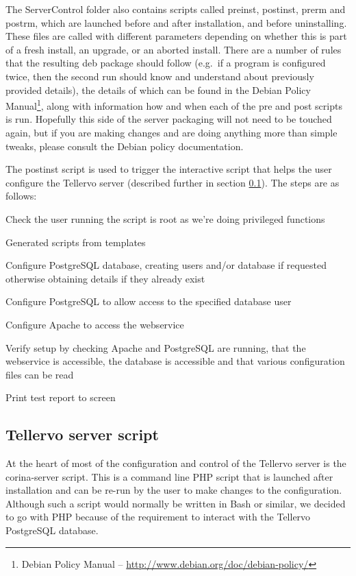 The ServerControl folder also contains scripts called preinst, postinst, prerm and postrm, which are launched before and after installation, and before uninstalling.  These files are called with different parameters depending on whether this is part of a fresh install, an upgrade, or an aborted install.  There are a number of rules that the resulting deb package should follow (e.g.\ if a program is configured twice, then the second run should know and understand about previously provided details), the details of which can be found in the Debian Policy Manual\footnote{Debian Policy Manual -- \url{http://www.debian.org/doc/debian-policy/}}, along with information how and when each of the pre and post scripts is run.  Hopefully this side of the server packaging will not need to be touched again, but if you are making changes and are doing anything more than simple tweaks, please consult the Debian policy documentation.

The postinst script is used to trigger the interactive script that helps the user configure the Tellervo server (described further in section \ref{txt:corina-server-script}).  The steps are as follows:  

\begin{itemize*}
 \item Check the user running the script is root as we're doing privileged functions
 \item Generated scripts from templates
 \item Configure PostgreSQL database, creating users and/or database if requested otherwise obtaining details if they already exist
 \item Configure PostgreSQL to allow access to the specified database user
 \item Configure Apache to access the webservice
 \item Verify setup by checking Apache and PostgreSQL are running, that the webservice is accessible, the database is accessible and that various configuration files can be read
 \item Print test report to screen
\end{itemize*}

\subsection{Tellervo server script}
\label{txt:corina-server-script}

At the heart of most of the configuration and control of the Tellervo server is the corina-server script.  This is a command line PHP script that is launched after installation and can be re-run by the user to make changes to the configuration.  Although such a script would normally be written in Bash or similar, we decided to go with PHP because of the requirement to interact with the Tellervo PostgreSQL database.  

